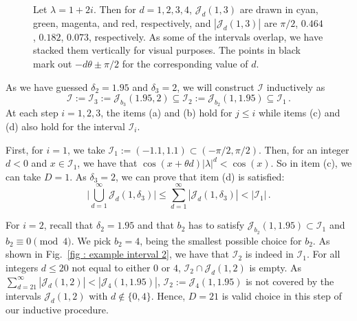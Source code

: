 \documentclass[a4paper,UKenglish,cleveref, autoref, thm-restate]{lipics-v2021}
\begin{document}
\begin{figure}
    \caption{Let $\lambda = 1+2i$. Then for $d = 1,2,3,4$, $\mathcal{J}_d(1, 3)$ are drawn in cyan, green, magenta, and red, respectively, and $|\mathcal{J}_d(1, 3)|$ are $\pi/2$, $0.464$, $0.182$, $0.073$, respectively. 
    As some of the intervals overlap, we have stacked them vertically for visual purposes. The points in black mark out $-d\theta \pm\pi/2$ for the corresponding value of $d$.}
    \label{fig : examples of intervals}
\end{figure}


As we have guessed $\delta_2 = 1.95$ and $\delta_3 = 2$, we will construct $\mathcal{I}$ inductively as 
\begin{equation*}
    \mathcal{I} := \mathcal{I}_3 := \mathcal{J}_{b_3}(1.95,2) \subseteq \mathcal{I}_2 := \mathcal{J}_{b_2}(1,1.95)\subseteq \mathcal{I}_1 \, .
\end{equation*}
At each step $i=1,2,3$, the items (a) and (b) hold for $j \le i$ while items (c) and (d) also hold for the interval $\mathcal{I}_i$.

First, for $i = 1$, we take $\mathcal{I}_1 := (-1.1, 1.1) \subset (-\pi/2, \pi/2)$.
Then, for an integer $d < 0$ and $x \in \mathcal{I}_1$, we have that $\cos(x + \theta d)|\lambda|^{d} < \cos(x)$.
So in item (c), we can take $D = 1$. 
As $\delta_3 = 2$,
we can prove that item (d) is satisfied:
\begin{equation}\label{eq : strong inequality sizes J_d}
    \Big|\bigcup_{d = 1}^\infty \mathcal{J}_d(1, \delta_3)\Big| \le \sum_{d = 1}^\infty |\mathcal{J}_d(1, \delta_3)| <  |\mathcal{I}_1| \, .
\end{equation}

For $i = 2$, recall that $\delta_2 = 1.95$ and that $b_2$ has to satisfy $\mathcal{J}_{b_2}(1, 1.95) \subset \mathcal{I}_1$ and $b_2 \equiv 0 \pmod 4$. 
We pick $b_2 = 4$, being the smallest possible choice for $b_2$.
As shown in Fig.~\ref{fig : example interval 2}, we have that $\mathcal{I}_2$ is indeed in $\mathcal{I}_1$.
For all integers $d \le 20$ not equal to either $0$ or $4$, $\mathcal{I}_2 \cap \mathcal{J}_d(1, 2)$ is empty.
As $\sum_{d = 21}^\infty |\mathcal{J}_d(1, 2)| < |\mathcal{J}_4(1,
1.95)|$, $\mathcal{I}_2 := \mathcal{J}_4(1, 1.95)$ is not covered by
the intervals $\mathcal{J}_d(1, 2)$ with $d \notin \{0, 4\}$.
Hence, $D = 21$ is valid choice in this step of our inductive procedure. 
\end{document}
